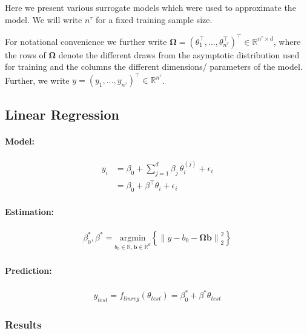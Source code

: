 \documentclass[a4paper, 12pt]{article}
\newcommand{\norm}[1]{\left\lVert#1\right\rVert}
\begin{document}
Here we present various surrogate models which were used to approximate the model.
We will write $n^\tau$ for a fixed training sample size.

For notational convenience we further write $\bm{\Omega} = (\theta_1^\top, \dots, \theta_{n^\tau}^\top)^\top \in \mathbb{R}^{n^\tau \times d}$, where the rows of $\bm{\Omega}$ denote the different draws from the asymptotic distribution used for training and the columns the different dimensions/ parameters of the model.
Further, we write $y = (y_1, \dots, y_{n^\tau})^\top \in \mathbb{R}^{n^\tau}$.

\subsection{Linear Regression}

\paragraph{Model:}
\begin{align}\label{eq:linear_model}
  y_i &= \beta_0 + \sum_{j = 1}^d \beta_j \, \theta_i^{(j)} + \epsilon_i\\
      &= \beta_0 + \beta^\top \theta_i + \epsilon_i
\end{align}

\paragraph{Estimation:}

\begin{align}
  \beta_0^*, \beta^* = \underset{b_0 \in \mathbb{R}, \bm{b} \in \mathbb{R}^d}{\text{argmin}} \left\{  \norm{y - b_0 - \bm{\Omega} \bm{b}}_2^2 \right \}
\end{align}

\paragraph{Prediction:}
\begin{align}\label{eq:linear_prediction}
  y_{test} = f_{linreg}(\theta_{test}) = \beta_0^* + \beta^* \theta_{test}
\end{align}


\subsubsection{Results}
\end{document}
